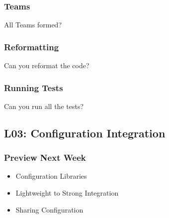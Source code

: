 \begin{frame}
	\frametitle{Teams}

	\begin{task}
	All Teams formed?
	\end{task}
\end{frame}

\begin{frame}
	\frametitle{Reformatting}

	\begin{task}
	Can you reformat the code?
	\end{task}
\end{frame}

\begin{frame}
	\frametitle{Running Tests}

	\begin{task}
	Can you run all the tests?
	\end{task}
\end{frame}

\subsection{L03: Configuration Integration}

\begin{frame}
	\frametitle{Preview Next Week}

	\begin{itemize}
	\item Configuration Libraries
	\item Lightweight to Strong Integration
	\item Sharing Configuration
	\end{itemize}
\end{frame}




\nocite{raab2017introducing}

\appendix

\begin{frame}[allowframebreaks]
	
	
\end{frame}




